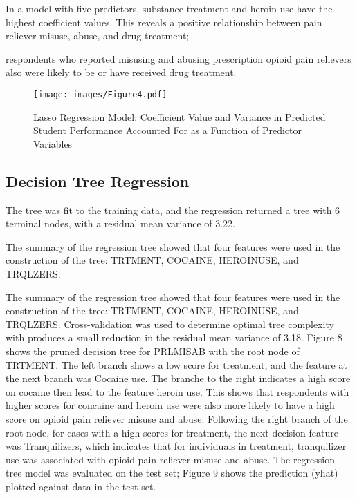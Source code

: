 \documentclass[sigconf]{acmart}
\begin{document}
In a model with five predictors, substance treatment and heroin use have the 
highest coefficient values. This reveals a positive relationship between pain 
reliever misuse, abuse, and drug treatment; 

respondents who reported misusing and abusing prescription opioid pain relievers
also were likely to be or have received drug treatment. 



\begin{figure}[!ht]
  \centering\texttt{[image: images/Figure4.pdf]}
  \caption{Lasso Regression Model: Coefficient Value and Variance in Predicted 
  Student Performance Accounted For as a Function of Predictor Variables }
  \label{f:Figure4}
\end{figure}


\subsection{Decision Tree Regression}

The tree was fit to the training data, and the regression returned a tree with 
6 terminal nodes, with a residual mean variance of 3.22. 

The summary of the regression tree showed that four features were used in the 
construction of the tree: TRTMENT, COCAINE, HEROINUSE, and TRQLZERS. 

The summary of the 
regression tree showed that four features were used in the construction of 
the tree: TRTMENT, COCAINE, HEROINUSE, and TRQLZERS. Cross-validation 
was used to determine optimal tree complexity with produces a small reduction
in the residual mean variance of 3.18. Figure 8 shows the pruned decision tree 
for PRLMISAB with the root node of TRTMENT. The left branch shows a low 
score for treatment, and the feature at the next branch was Cocaine use. 
The branche to the right indicates a high score on cocaine then lead to 
the feature heroin use. This shows that respondents with higher scores for 
concaine and heroin use were also more likely to have a high score on 
opioid pain reliever misuse and abuse. Following the right branch of the 
root node, for cases with a high scores for treatment, the next decision 
feature was Tranquilizers, which indicates that for individuals in treatment, 
tranquilizer use was associated with opioid pain reliever misuse and abuse. 
The regression tree model was evaluated on the test set; Figure 9 shows 
the prediction (yhat) plotted against data in the test set.
\end{document}

